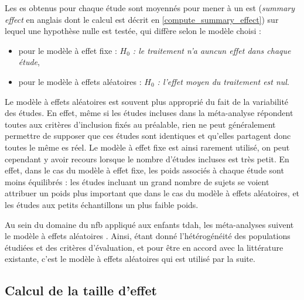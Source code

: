 Les \gls{es} obtenus pour chaque étude sont moyennés pour mener à un \gls{est} (\textit{summary effect} en anglais dont le calcul est
décrit en \ref{compute_summary_effect}) sur lequel une hypothèse nulle est testée, qui diffère selon le modèle choisi :
\begin{itemize}
\item pour le modèle à effet fixe : 
\textit{$H_{0}$ : le traitement n'a auncun effet dans chaque étude},
\item pour le modèle à effets aléatoires : 
\textit{$H_{0}$ : l'effet moyen du traitement est nul}.
\end{itemize}

Le modèle à effets aléatoires est souvent plus approprié du fait de la variabilité des études. En effet, même si les études incluses dans la méta-analyse 
répondent toutes aux critères d'inclusion fixés au préalable, rien ne peut généralement permettre de supposer que ces études sont identiques et qu'elles 
partagent donc toutes le même \gls{es} réel. Le modèle à effet fixe est ainsi rarement utilisé, on peut cependant y avoir recours lorsque le nombre d'études incluses 
est très petit. En effet, dans le cas du modèle à effet fixe, les poids associés à chaque étude sont moins équilibrés : les études incluant un grand nombre de 
sujets se voient attribuer un poids plus important que dans le cas du modèle à effets aléatoires, et les études aux petits échantillons un plus faible poids.

Au sein du domaine du \gls{nfb} appliqué aux enfants \gls{tdah}, les méta-analyses suivent le modèle à effets aléatoires 
\citep{Cortese2016, Micoulaud2014}. Ainsi, étant donné l'hétérogénéité des populations étudiées et des critères d'évaluation, et pour être en accord avec
la littérature existante, c'est le modèle à effets aléatoires qui est utilisé par la suite.

\subsection{Calcul de la taille d'effet} \label{definition_es}

